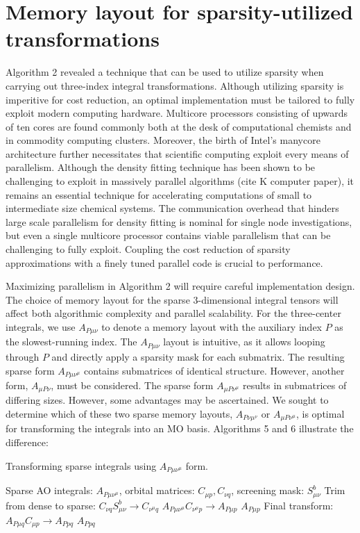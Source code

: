 \section{Memory layout for sparsity-utilized transformations}

Algorithm 2 revealed a technique that can be used to utilize sparsity when carrying out three-index integral transformations.
Although utilizing sparsity is imperitive for cost reduction, an optimal implementation must be tailored to
fully exploit modern computing hardware.
Multicore processors consisting of upwards of ten cores are found commonly both at the desk of computational
chemists and in commodity computing clusters.
Moreover, the birth of Intel's manycore architecture further necessitates that scientific computing
exploit every means of parallelism.
Although the density fitting technique has been shown to be challenging to exploit in massively parallel
algorithms (cite K computer paper), it remains an essential technique for accelerating computations of 
small to intermediate size chemical systems.
The communication overhead that hinders large scale parallelism for density
fitting is nominal for single node investigations, but even a single multicore processor contains viable
parallelism that can be challenging to fully exploit. 
Coupling the cost reduction of sparsity approximations with a finely tuned parallel code is crucial to performance.   

Maximizing parallelism in Algorithm 2 will require careful implementation design. 
The choice of memory layout for the sparse 3-dimensional integral tensors will affect both algorithmic 
complexity and parallel scalability. For the three-center integrals, we use $A_{P\mu \nu}$ to denote a memory 
layout with the auxiliary index $P$ as the slowest-running index. 
The $A_{P \mu \nu}$ layout is intuitive, as it allows looping through $P$ and directly apply a sparsity mask 
for each submatrix. The resulting sparse form $A_{P \mu \nu^\mu}$ contains submatrices of identical structure.
However, another form, $A_{\mu P \nu}$, must be considered. The sparse form $A_{\mu P \nu^\mu}$
results in submatrices of differing sizes. However, some advantages may be ascertained.
We sought to determine which of these two sparse memory layouts, $A_{P \nu \mu^\nu}$ or 
$A_{\mu P \nu^\mu}$, is optimal for transforming the integrals into an MO basis.
Algorithms 5 and 6 illustrate the difference:

\begin{algorithm}[H]
\caption{Transforming sparse integrals using $A_{P \mu \nu^\mu}$ form.}
\begin{algorithmic}
\REQUIRE Sparse AO integrals: $A_{P \mu \nu^\mu}$, orbital matrices: $C_{\mu p}, C_{\nu q}$, screening mask: $S_{\mu \nu}^b$
    \STATE Trim from dense to sparse: $C_{\nu q}S_{\mu \nu}^b \rightarrow C_{\nu^{\mu} q}$
    \STATE $A_{P \mu \nu^\mu} C_{\nu^{\mu} p} \rightarrow A_{P \mu p}$
\ENDFOR
\RETURN $A_{P \mu p}$
\STATE Final transform: $A_{P \mu q}C_{\mu p} \rightarrow A_{P p q}$
\RETURN $A_{P p q}$
\end{algorithmic}
\end{algorithm}

